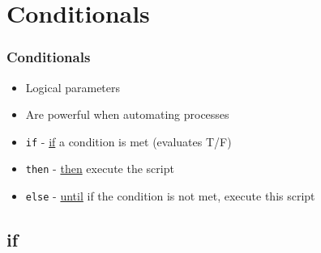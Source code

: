 \documentclass[14pt,handout]{beamer}
\begin{document}

\section{Conditionals}

\begin{frame}
\frametitle{Conditionals}
\begin{itemize}
	\item<+-> Logical parameters
	\item<+-> Are powerful when automating processes
	\item<+-> \texttt{if} - \underline{if} a condition is met (evaluates T/F)
	\item<+-> \texttt{then} - \underline{then} execute the script
	\item<+-> \texttt{else} - \underline{until} if the condition is not met, execute this script
\end{itemize}
\end{frame}

\subsection{if}
\end{document}
